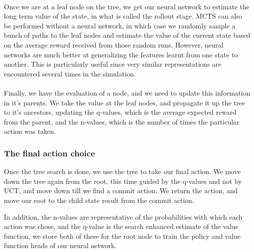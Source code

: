 \documentclass[%
 reprint,
 amsmath,amssymb,
 aps,
]{revtex4-2}
\begin{document}
\paragraph{} Once we are at a leaf node on the tree, we get our neural network to estimate the long term value of the state, in what is called the rollout stage. MCTS can also be performed without a neural network, in which case we randomly sample a bunch of paths to the leaf nodes and estimate the value of the current state based on the average reward received from those random runs. However, neural networks are much better at generalizing the features learnt from one state to another. This is particularly useful since very similar representations are encountered several times in the simulation.

\paragraph{} Finally, we have the evaluation of a node, and we need to update this information in it's parents. We take the value at the leaf nodes, and propagate it up the tree to it's ancestors, updating the q-values, which is the average expected reward from the parent, and the n-values, which is the number of times the particular action was taken.

\subsubsection{The final action choice}

Once the tree search is done, we use the tree to take our final action. We move down the tree again from the root, this time guided by the q-values and not by UCT, and move down till we find a commit action. We return the action, and move our root to the child state result from the commit action.

In addition, the n-values are representative of the probabilities with which each action was chose, and the q-value is the search enhanced estimate of the value function, we store both of these for the root node to train the policy and value function heads of our neural network.
\end{document}
